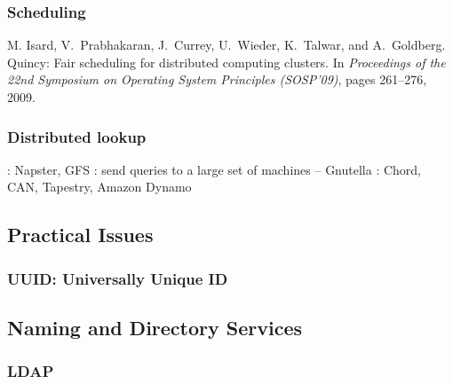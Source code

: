 \documentclass{myproc}
\begin{document}
\subsubsection{Scheduling}
\bit
\w M. Isard, V.~Prabhakaran, J.~Currey, U.~Wieder, K.~Talwar, and A.~Goldberg.
\newblock Quincy: Fair scheduling for distributed computing clusters.
\newblock In {\em Proceedings of the 22nd Symposium on Operating System
  Principles (SOSP'09)}, pages 261--276, 2009.
\eit

\subsubsection{Distributed lookup}
\bit
\w {}: Napster, GFS
\w {}: send queries to a large set of machines -- Gnutella
\w {}: Chord, CAN, Tapestry, Amazon Dynamo
\eit

\subsection{Practical Issues}
\subsubsection{\textcolor{red2}{\bf{}UUID: Universally Unique ID}}


\subsection{Naming and Directory Services}
\subsubsection{LDAP}
\end{document}
